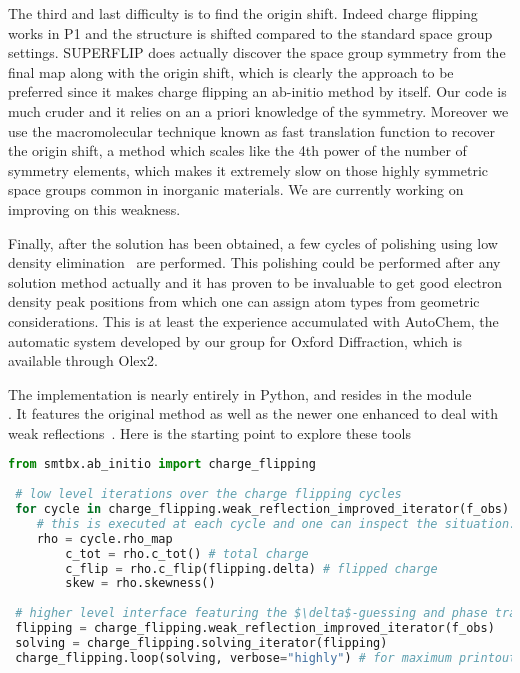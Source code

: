 \documentclass[12pt]{article}
\begin{document}
The third and last difficulty is to find the origin shift. Indeed charge flipping works in P1 and the structure is shifted compared to the standard space group settings. SUPERFLIP does actually discover the space group symmetry from the final map along with the origin shift, which is clearly the approach to be preferred since it makes charge flipping an ab-initio method by itself. Our code is much cruder and it relies on an a priori knowledge of the symmetry. Moreover we use the macromolecular technique known as fast translation function to recover the origin shift, a method which scales like the 4th power of the number of symmetry elements, which makes it extremely slow on those highly symmetric space groups common in inorganic materials. We are currently working on improving on this weakness.

Finally, after the solution has been obtained, a few cycles of polishing using low density elimination~\cite{Shiono:1992} are performed. This polishing could be performed after any solution method actually and it has proven to be invaluable to get good electron density peak positions from which one can assign atom types from geometric considerations. This is at least the experience accumulated with AutoChem, the automatic system developed by our group for Oxford Diffraction, which is available through Olex2.

The implementation is nearly entirely in Python, and resides in the module\\ . It features the original method as well as the newer one enhanced to deal with weak reflections~\cite{Oszlanyi:2004}. Here is the starting point to explore these tools
 \begin{lstlisting}[language=Python]
 from smtbx.ab_initio import charge_flipping
 
 # low level iterations over the charge flipping cycles
 for cycle in charge_flipping.weak_reflection_improved_iterator(f_obs):
 	# this is executed at each cycle and one can inspect the situation:
	rho = cycle.rho_map
        c_tot = rho.c_tot() # total charge
        c_flip = rho.c_flip(flipping.delta) # flipped charge
        skew = rho.skewness()
 
 # higher level interface featuring the $\delta$-guessing and phase transition detection
 flipping = charge_flipping.weak_reflection_improved_iterator(f_obs)
 solving = charge_flipping.solving_iterator(flipping)
 charge_flipping.loop(solving, verbose="highly") # for maximum printout 
\end{lstlisting}
\end{document}
